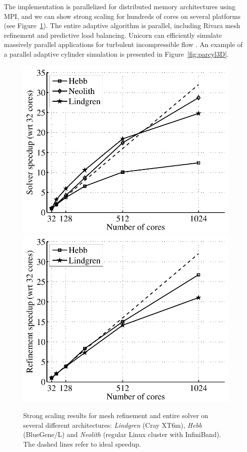 The  implementation is parallelized for distributed
memory architectures using MPI, and we can show strong scaling for
hundreds of cores on several platforms (see
Figure~\ref{fig:hoffman-2:sp}). The entire adaptive algorithm is
parallel, including Rivara mesh refinement and \apriori{} predictive
load balancing. Unicorn can efficiently simulate massively parallel
applications for turbulent incompressible flow
\citep{JanssonHoffmanJansson2010, Jansson2011}. An example of a
parallel adaptive cylinder simulation is presented in
Figure~\ref{fig:parcyl3D}.

\begin{figure}
  \centering
  \includegraphics[width=\largefig]{chapters/hoffman-2/pdf/speedup_solve.pdf} \\
  \includegraphics[width=\largefig]{chapters/hoffman-2/pdf/speedup_unrivara.pdf}
  \caption{\label{fig:hoffman-2:sp} Strong scaling results for mesh
    refinement and entire solver on several different architectures:
    \textit{Lindgren} (Cray XT6m), \textit{Hebb} (BlueGene/L) and
    \textit{Neolith} (regular Linux cluster with InfiniBand). The
    dashed lines refer to ideal speedup.}
\end{figure}

